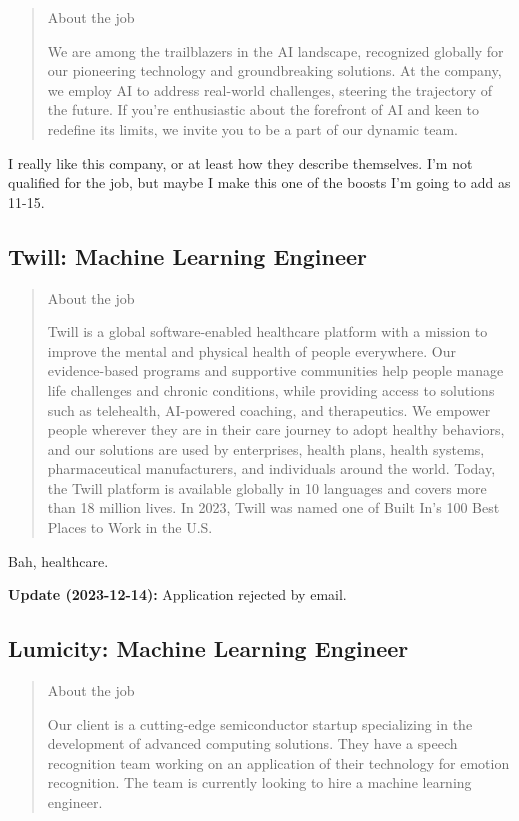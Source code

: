 \documentclass[
	letterpaper, %
	12pt, %
]{CSSullivanBusinessReport}
\begin{document}
\begin{quote}
	About the job
	
	We are among the trailblazers in the AI landscape, recognized globally for our pioneering technology and groundbreaking solutions. At the company, we employ AI to address real-world challenges, steering the trajectory of the future. If you're enthusiastic about the forefront of AI and keen to redefine its limits, we invite you to be a part of our dynamic team.

\end{quote}

I really like this company, or at least how they describe themselves. I'm not qualified for the job, but maybe I make this one of the boosts I'm going to add as 11-15.  


\subsection[Twill]{Twill: Machine Learning Engineer}

\begin{quote}
	About the job
	
	Twill is a global software-enabled healthcare platform with a mission to improve the mental and physical health of people everywhere. Our evidence-based programs and supportive communities help people manage life challenges and chronic conditions, while providing access to solutions such as telehealth, AI-powered coaching, and therapeutics. We empower people wherever they are in their care journey to adopt healthy behaviors, and our solutions are used by enterprises, health plans, health systems, pharmaceutical manufacturers, and individuals around the world. Today, the Twill platform is available globally in 10 languages and covers more than 18 million lives. In 2023, Twill was named one of Built In's 100 Best Places to Work in the U.S.

\end{quote}

Bah, healthcare. 

\textbf{Update (2023-12-14):} Application rejected by email.


\subsection[Lumicity]{Lumicity: Machine Learning Engineer}

\begin{quote}
	About the job
	
	Our client is a cutting-edge semiconductor startup specializing in the development of advanced computing solutions. They have a speech recognition team working on an application of their technology for emotion recognition. The team is currently looking to hire a machine learning engineer. 

\end{quote}
\end{document}
